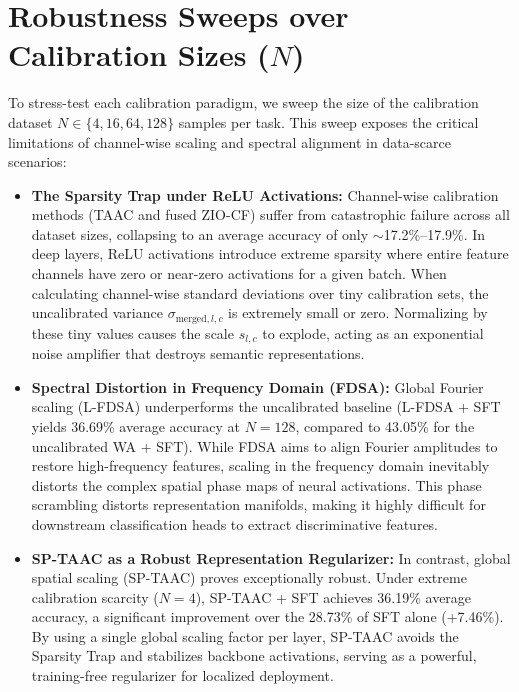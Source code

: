 \documentclass{article}
\theoremstyle{plain}
\theoremstyle{definition}
\theoremstyle{remark}
\begin{document}
\section{Robustness Sweeps over Calibration Sizes ($N$)}
\label{app:sweeps}
To stress-test each calibration paradigm, we sweep the size of the calibration dataset $N \in \{4, 16, 64, 128\}$ samples per task. This sweep exposes the critical limitations of channel-wise scaling and spectral alignment in data-scarce scenarios:
\begin{itemize}
    \item \textbf{The Sparsity Trap under ReLU Activations:} Channel-wise calibration methods (TAAC and fused ZIO-CF) suffer from catastrophic failure across all dataset sizes, collapsing to an average accuracy of only $\sim$17.2\%--17.9\%. In deep layers, ReLU activations introduce extreme sparsity where entire feature channels have zero or near-zero activations for a given batch. When calculating channel-wise standard deviations over tiny calibration sets, the uncalibrated variance $\sigma_{\text{merged}, l, c}$ is extremely small or zero. Normalizing by these tiny values causes the scale $s_{l, c}$ to explode, acting as an exponential noise amplifier that destroys semantic representations.
    \item \textbf{Spectral Distortion in Frequency Domain (FDSA):} Global Fourier scaling (L-FDSA) underperforms the uncalibrated baseline (L-FDSA + SFT yields 36.69\% average accuracy at $N=128$, compared to 43.05\% for the uncalibrated WA + SFT). While FDSA aims to align Fourier amplitudes to restore high-frequency features, scaling in the frequency domain inevitably distorts the complex spatial phase maps of neural activations. This phase scrambling distorts representation manifolds, making it highly difficult for downstream classification heads to extract discriminative features.
    \item \textbf{SP-TAAC as a Robust Representation Regularizer:} In contrast, global spatial scaling (SP-TAAC) proves exceptionally robust. Under extreme calibration scarcity ($N=4$), SP-TAAC + SFT achieves 36.19\% average accuracy, a significant improvement over the 28.73\% of SFT alone (+7.46\%). By using a single global scaling factor per layer, SP-TAAC avoids the Sparsity Trap and stabilizes backbone activations, serving as a powerful, training-free regularizer for localized deployment.
\end{itemize}
\end{document}

